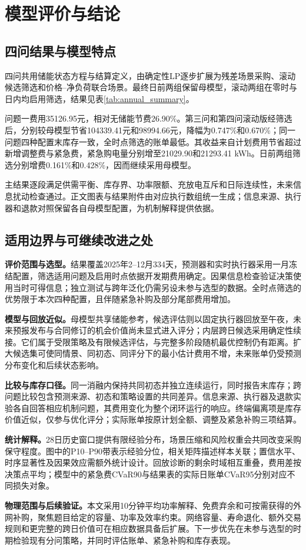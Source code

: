 \section{模型评价与结论}

\subsection{四问结果与模型特点}

四问共用储能状态方程与结算定义，由确定性LP逐步扩展为残差场景采购、滚动候选筛选和价格--净负荷联合场景。最终日前两组保留母模型，滚动两组在零时与日内均启用筛选，结果见表\ref{tab:annual_summary}。



问题一费用35126.95元，相对无储能节费26.90\%。第三问和第四问滚动版经筛选后，分别较母模型节省104339.41元和98994.66元，降幅为0.747\%和0.670\%；同一问题四种配置末库存一致，全时点筛选的账单最低。其收益来自计划费用节省超过新增调整费与紧急费，紧急购电量分别增至21029.90和21293.41 kWh。日前两组筛选分别增费0.161\%和0.428\%，因而继续采用母模型。

主结果逐段满足供需平衡、库存界、功率限额、充放电互斥和日际连续性，未来信息扰动检查通过。正文图表与结果附件由对应执行数组统一生成；信息来源、执行器和退款对照保留各自母模型配置，为机制解释提供依据。

\subsection{适用边界与可继续改进之处}
\label{sec:limitations}

\textbf{评价范围与选型。}结果覆盖2025年2--12月334天，预测器和实时执行器采用一月冻结配置，筛选适用问题及启用时点依据开发期费用确定。因果信息检查验证决策使用当时可得信息；独立测试与跨年泛化仍需另设未参与选型的数据。全时点筛选的优势限于本次四种配置，且伴随紧急补购及部分尾部费用增加。

\textbf{模型与回放近似。}母模型共享储能参考，候选评估则以固定执行器回放至午夜，未来预报发布与合同修订的机会价值尚未显式进入评分；内层跨日候选采用确定性续接。它们属于受限策略及有限候选评估，与完整多阶段随机最优控制仍有距离。扩大候选集可使同情景、同初态、同评分下的最小估计费用不增，未来账单仍受预测分布变化和后续状态影响。

\textbf{比较与库存口径。}同一消融内保持共同初态并独立连续运行，同时报告末库存；跨问题比较包含预测来源、初态和策略设置的共同差异。信息来源、执行器及退款实验各自回答相应机制问题，其费用变化为整个闭环运行的响应。终端偏离项是库存价值近似，仅参与优化评分；实际账单按原计划全额、调整及紧急补购三项结算。

\textbf{统计解释。}28日历史窗口提供有限经验分布，场景压缩和风险权重会共同改变采购保守程度。图中的P10--P90带表示经验分位，相关矩阵描述样本关联；置信水平、时序显著性及因果效应需额外统计设计。回放诊断的剩余时域相互重叠，费用差按决策点平均；模型中的紧急费CVaR90与结果表的实际日账单CVaR95分别对应不同损失对象。

\textbf{物理范围与后续验证。}本文采用10分钟平均功率解释、免费弃余和可按需获得的外网补购，聚焦题目给定的容量、功率及效率约束。网络容量、寿命退化、额外交易规则和更完整的跨日价值可在相应数据具备后扩展。下一步优先在未参与选型的时期检验现有分问策略，并同时评估账单、紧急补购和库存表现。
